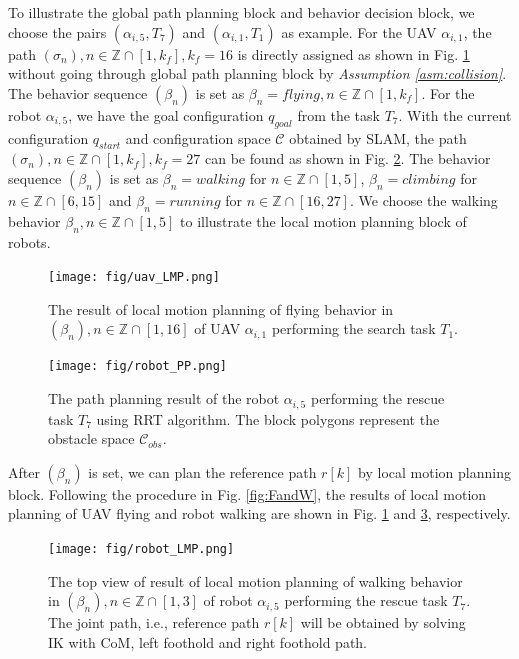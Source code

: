 \documentclass[journal,12pt,onecolumn,draftclsnofoot,]{IEEEtran}
\begin{document}
To illustrate the global path planning block and behavior decision block, we choose the pairs $(\alpha_{i,5},T_7)$ and $(\alpha_{i,1}, T_1)$ as example. For the UAV $\alpha_{i,1}$, the path $(\sigma_n),n\in\mathbb{Z}\cap[1,k_f],k_f=16$ is directly assigned as shown in Fig. \ref{sim:flying} without going through global path planning block by \textit{Assumption \ref{asm:collision}}. The behavior sequence $(\beta_n)$ is set as $\beta_n=\mathit{flying}, n\in\mathbb{Z}\cap[1,k_f]$. For the robot $\alpha_{i,5}$, we have the goal configuration $q_{goal}$ from the task $T_7$. With the current configuration $q_{start}$ and configuration space $\mathcal{C}$ obtained by SLAM, the path $(\sigma_n),n\in\mathbb{Z}\cap[1,k_f],k_f=27$ can be found as shown in Fig. \ref{fig:R_task}. The behavior sequence $(\beta_n)$ is set as $\beta_n=\mathit{walking}$ for $n\in\mathbb{Z}\cap[1,5]$, $\beta_n=\mathit{climbing}$ for $n\in\mathbb{Z}\cap[6,15]$ and $\beta_n=\mathit{running}$ for $n\in\mathbb{Z}\cap[16,27]$. We choose the walking behavior $\beta_n, n\in\mathbb{Z}\cap[1,5]$ to illustrate the local motion planning block of robots.
\begin{figure}[htbp]
    \centering
    \texttt{[image: fig/uav\_LMP.png]}\caption{The result of local motion planning of flying behavior in $(\beta_n), n\in\mathbb{Z}\cap[1,16]$ of UAV $\alpha_{i,1}$ performing the search task $T_1$.}%
    \label{sim:flying}
\end{figure}
\begin{figure}[htbp]
    \centering
    \texttt{[image: fig/robot\_PP.png]}\caption{The path planning result of the robot $\alpha_{i,5}$ performing the rescue task $T_7$ using RRT algorithm. The block polygons represent the obstacle space $\mathcal{C}_{obs}$.}%
    \label{fig:R_task}
\end{figure}

After $(\beta_n)$ is set, we can plan the reference path $r[k]$ by local motion planning block. Following the procedure in Fig. \ref{fig:FandW}, the results of local motion planning of UAV flying and robot walking are shown in Fig. \ref{sim:flying} and \ref{sim:walking}, respectively.
\begin{figure}[htbp]
    \centering
    \texttt{[image: fig/robot\_LMP.png]}\caption{The top view of result of local motion planning of walking behavior in $(\beta_n), n\in\mathbb{Z}\cap[1,3]$ of robot $\alpha_{i,5}$ performing the rescue task $T_7$. The joint path, i.e., reference path $r[k]$ will be obtained by solving IK with CoM, left foothold and right foothold path.}
    \label{sim:walking}
\end{figure}
\end{document}
